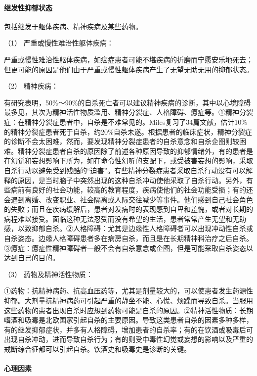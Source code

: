 \paragraph{继发性抑郁状态}

包括继发于躯体疾病、精神疾病及某些药物。

\hypertarget{text00052.htmlux5cux23CHP1-18-10-2-2-1}{}
（1） 严重或慢性难治性躯体疾病：

严重或慢性难治性躯体疾病，如癌症患者可能不堪疾病的折磨而宁愿安乐地死去；但更可能的原因是他们由于严重或慢性躯体疾病产生了无望无助无用的抑郁状态。

\hypertarget{text00052.htmlux5cux23CHP1-18-10-2-2-2}{}
（2） 精神疾病：

有研究表明，50\%～90\%的自杀死亡者可以建议精神疾病的诊断，其中以心境障碍最多见，其次为精神活性物质滥用、精神分裂症、人格障碍、癔症等。①精神分裂症：在精神分裂症患者中，自杀是不难常见的。Miles复习了34篇文献，估计10\%的精神分裂症患者死于自杀，约20\%自杀未遂。根据患者的临床症状，精神分裂症的诊断不会太困难，然而，要发现精神分裂症患者的自杀意念和自杀企图则较困难。精神分裂症患者自杀的原因除了前述各种原因导致的抑郁情绪外，有的患者是在幻觉和妄想影响下所为，如在命令性幻听的支配下，或受被害妄想的影响，采取自杀行动以避免受到残酷的“迫害”。有些精神分裂症患者采取自杀行动没有可以解释的原因，是当时脑子中突然出现的这种自杀冲动使他采取了自杀行动。另外，有些病前有良好的社会功能，较高的教育程度，疾病使他们的社会功能受损；有的还会遇到离婚、改变职业、社会隔离或人际交往减少等事件。他们感到自己社会角色的失败；而且在疾病缓解后，患者对发病时的表现感到自卑和羞愧，或者对长期的病程难以接受。面临这种无法忍受而没有希望的生活，患者常常产生无望和无助感，以致抑郁自杀。②人格障碍：尤其是边缘性人格障碍者可以出现冲动性自杀或自杀姿态。边缘人格障碍患者多在病房自杀，而且是在长期精神科治疗之后自杀。③癔症：癔症性精神障碍者一般不会有自杀意念或企图，但是可能采取自杀姿态以达到自己的目的。

\hypertarget{text00052.htmlux5cux23CHP1-18-10-2-2-3}{}
（3） 药物及精神活性物质：

①药物：抗精神病药、抗高血压药等，尤其是剂量较大的，可以使患者发生药源性抑郁。大剂量抗精神病药可引起严重的静坐不能、心慌、烦躁而导致自杀。当服用这些药物的患者出现自杀时应想到药物可能是自杀的原因。②精神活性物质：长期嗜酒和吸毒是北欧国家引起自杀的主要原因。导致这类患者自杀的因素多种多样，有的继发抑郁症状，并多有人格障碍，增加患者的自杀率；有的在饮酒或吸毒后可出现自杀冲动，进而导致自杀行为；有的则受中毒性幻觉或妄想的影响以及严重的戒断综合征都可以引起自杀。饮酒史和吸毒史是诊断的关键。

\paragraph{心理因素}

